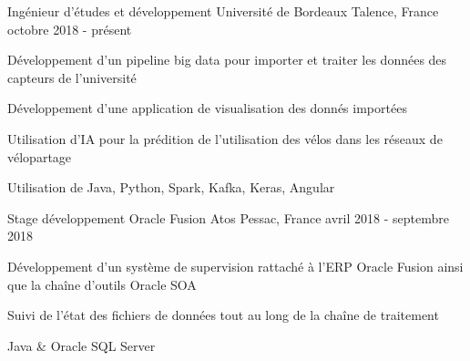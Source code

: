 
\begin{cventries}
	\cventry
	{Ingénieur d'études et développement}
	{Université de Bordeaux}
	{Talence, France}
	{octobre 2018 - présent}
	{
		\begin{cvitems}
			\item {Développement d'un pipeline big data pour importer et traiter les données des capteurs de l'université}
			\item {Développement d'une application de visualisation des donnés importées}
			\item {Utilisation d'IA pour la prédition de l'utilisation des vélos dans les réseaux de vélopartage}
			\item {Utilisation de Java, Python, Spark, Kafka, Keras, Angular}
		\end{cvitems}
	}
	
	\cventry
	{Stage développement Oracle Fusion}
	{Atos}
	{Pessac, France}
	{avril 2018 - septembre 2018}
	{
		\begin{cvitems}
			\item {Développement d'un système de supervision rattaché à l'ERP Oracle Fusion ainsi que la chaîne d'outils Oracle SOA}
			\item {Suivi de l'état des fichiers de données tout au long de la chaîne de traitement}
			\item {Java \& Oracle SQL Server}
		\end{cvitems}
	}
	
\end{cventries}
